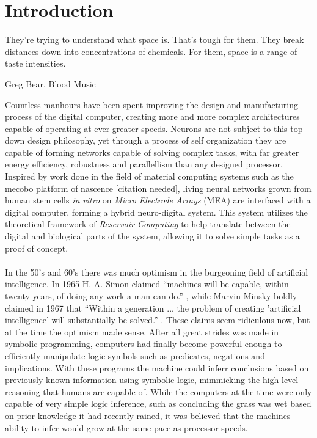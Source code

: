 \chapter{Introduction}
\epigraph{They're trying to understand what space is. That's tough for them.
They break distances down into concentrations of chemicals. For them, space is a
range of taste intensities.}{Greg Bear, Blood Music}
%
Countless manhours have been spent improving the design and manufacturing
process of the digital computer, creating more and more complex architectures
capable of operating at ever greater speeds.
%
Neurons are not subject to this top down design philosophy, yet through a
process of self organization they are capable of forming networks capable of
solving complex tasks, with far greater energy efficiency, robustness and
parallellism than any designed processor.
%
Inspired by work done in the field of material computing systems such as the
mecobo platform of nascence [citation needed], living neural networks grown from
human stem cells \emph{in vitro} on \emph{Micro Electrode Arrays} (MEA) are interfaced
with a digital computer, forming a hybrid neuro-digital system.
%
This system utilizes the theoretical framework of \emph{Reservoir Computing} to
help translate between the digital and biological parts of the system, allowing
it to solve simple tasks as a proof of concept.\\ \\
In the 50's and 60's there was much optimism in the burgeoning field of
artificial intelligence. In 1965 H. A. Simon claimed ``machines will be capable,
within twenty years, of doing any work a man can
do.''\cite{vardi_artificial_nodate} , while Marvin Minsky boldly claimed in 1967
that ``Within a generation ... the problem of creating 'artificial intelligence'
will substantially be solved.'' \cite{noauthor_marvin_nodate}.
These claims seem ridiculous now, but at the time the optimism made sense. After
all great strides was made in symbolic programming, computers had finally become
powerful enough to efficiently manipulate logic symbols such as predicates,
negations and implications. With these programs the machine could inferr
conclusions based on previously known information using symbolic logic,
mimmicking the high level reasoning that humans are capable of. While the
computers at the time were only capable of very simple logic inference, such as
concluding the grass was wet based on prior knowledge it had recently rained, it
was believed that the machines ability to infer would grow at the same pace as
processor speeds.
